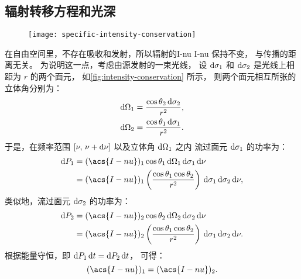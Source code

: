 \subsection{辐射转移方程和光深}
\label{sec:radiative-transfer}

\begin{figure}[htp]
  \centering
  \texttt{[image: specific-intensity-conservation]}
  \label{fig:intensity-conservation}
\end{figure}

在自由空间里，不存在吸收和发射，所以辐射的\acl*{I-nu} \acs*{I-nu} 保持不变，
与传播的距离无关。
为说明这一点，考虑由源发射的一束光线，
设 $\mathrm{d}\sigma_1$ 和 $\mathrm{d}\sigma_2$ 是光线上相距为 $r$ 的两个面元，
如\autoref{fig:intensity-conservation} 所示，
则两个面元相互所张的立体角分别为：
\begin{align}
  \mathrm{d}\Omega_1 & = \frac{\cos\theta_2 \,\mathrm{d}\sigma_2}{r^2} , \\
  \mathrm{d}\Omega_2 & = \frac{\cos\theta_1 \,\mathrm{d}\sigma_1}{r^2} .
\end{align}
于是，在频率范围 $[\nu, \,\nu+\mathrm{d}\nu]$ 以及立体角 $\mathrm{d}\Omega_1$ 之内
流过面元 $\mathrm{d}\sigma_1$ 的功率为：
\begin{align}
  \D{P_1} & = (\acs{I-nu})_1 \cos\theta_1
      \,\D{\Omega_1} \,\D{\sigma_1} \,\D{\nu}  \\
    & = (\acs{I-nu})_1 \left( \frac{\cos\theta_1 \cos\theta_2}{r^2} \right)
      \,\D{\sigma_1} \,\D{\sigma_2} \,\D{\nu} ,
\end{align}
类似地，流过面元 $\mathrm{d}\sigma_2$ 的功率为：
\begin{align}
  \D{P_2} & = (\acs{I-nu})_2 \cos\theta_2
      \,\D{\Omega_2} \,\D{\sigma_2} \,\D{\nu}  \\
    & = (\acs{I-nu})_2 \left( \frac{\cos\theta_1 \cos\theta_2}{r^2} \right)
      \,\D{\sigma_1} \,\D{\sigma_2} \,\D{\nu} .
\end{align}
根据能量守恒，即 $\mathrm{d}P_1\,\mathrm{d}t = \mathrm{d}P_2\,\mathrm{d}t$，
可得：
\begin{equation}
  \label{eq:intensity-conservation}
  (\acs{I-nu})_1 = (\acs{I-nu})_2 .
\end{equation}

